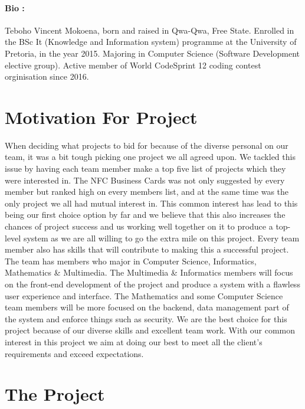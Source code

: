 \documentclass[11pt]{article}
\begin{document}
\paragraph{Bio :} Teboho Vincent Mokoena, born and raised in Qwa-Qwa, Free State. Enrolled in
the BSc It (Knowledge and Information system) programme at the University of
Pretoria, in the year 2015. Majoring in Computer Science (Software
Development elective group). Active member of World CodeSprint 12 coding
contest orginisation since 2016.

\section{Motivation For Project}
When deciding what projects to bid for because of the diverse personal on our team, it was a bit tough picking one project we all agreed upon. We tackled this issue by having each team member make a top five list of projects which they were interested in. The NFC Business Cards was not only suggested by every member but ranked high on every members list, and at the same time was the only project we all had mutual interest in. This common interest has lead to this being our first choice option by far and we believe that this also increases the chances of project success and us working well together on it to produce a top-level system as we are all willing to go the extra mile on this project.
\newline
\newline Every team member also has skills that will contribute to making this a successful project. The team has members who major in Computer Science, Informatics, Mathematics \& Multimedia. The Multimedia \& Informatics members will focus on the front-end development of the project and produce a system with a flawless user experience and interface. The Mathematics and some Computer Science team members will be more focused on the backend, data management part of the system and enforce things such as security.
\newline
\newline We are the best choice for this project because of our diverse skills and excellent team work. With our common interest in this project we aim at doing our best to meet all the client's requirements and exceed expectations.

\section{The Project}
\end{document}

